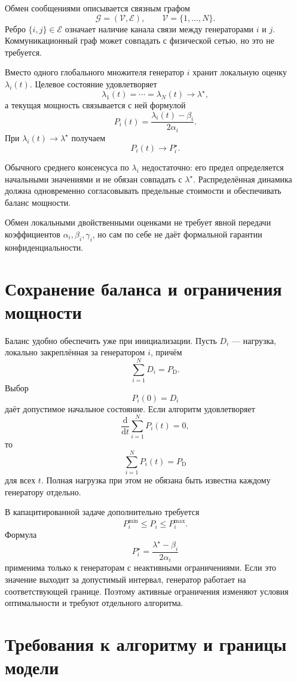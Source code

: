 Обмен сообщениями описывается связным графом
\[
    \mathcal G=(\mathcal V,\mathcal E),
    \qquad
    \mathcal V=\{1,\ldots,N\}.
\]
Ребро \(\{i,j\}\in\mathcal E\) означает наличие канала связи между
генераторами \(i\) и \(j\). Коммуникационный граф может совпадать с
физической сетью, но это не требуется.

Вместо одного глобального множителя генератор \(i\) хранит локальную
оценку \(\lambda_i(t)\). Целевое состояние удовлетворяет
\[
    \lambda_1(t)
    =
    \cdots
    =
    \lambda_N(t)
    \longrightarrow
    \lambda^\star,
\]
а текущая мощность связывается с ней формулой
\[
    P_i(t)
    =
    \frac{\lambda_i(t)-\beta_i}{2\alpha_i}.
\]
При \(\lambda_i(t)\to\lambda^\star\) получаем
\[
    P_i(t)\to P_i^\star.
\]

Обычного среднего консенсуса по \(\lambda_i\) недостаточно: его
предел определяется начальными значениями и не обязан совпадать с
\(\lambda^\star\). Распределённая динамика должна одновременно
согласовывать предельные стоимости и обеспечивать баланс мощности.

Обмен локальными двойственными оценками не требует явной передачи
коэффициентов \(\alpha_i,\beta_i,\gamma_i\), но сам по себе не даёт
формальной гарантии конфиденциальности.

\section{Сохранение баланса и ограничения мощности}

Баланс удобно обеспечить уже при инициализации. Пусть \(D_i\) ---
нагрузка, локально закреплённая за генератором \(i\), причём
\[
    \sum_{i=1}^{N}D_i=P_{\mathrm D}.
\]
Выбор
\[
    P_i(0)=D_i
\]
даёт допустимое начальное состояние. Если алгоритм удовлетворяет
\[
    \frac{\mathrm d}{\mathrm dt}
    \sum_{i=1}^{N}P_i(t)=0,
\]
то
\[
    \sum_{i=1}^{N}P_i(t)=P_{\mathrm D}
\]
для всех \(t\). Полная нагрузка при этом не обязана быть известна
каждому генератору отдельно.

В капацитированной задаче дополнительно требуется
\[
    P_i^{\min}\le P_i\le P_i^{\max}.
\]
Формула
\[
    P_i^\star
    =
    \frac{\lambda^\star-\beta_i}{2\alpha_i}
\]
применима только к генераторам с неактивными ограничениями. Если это
значение выходит за допустимый интервал, генератор работает на
соответствующей границе. Поэтому активные ограничения изменяют
условия оптимальности и требуют отдельного алгоритма.

\section{Требования к алгоритму и границы модели}

